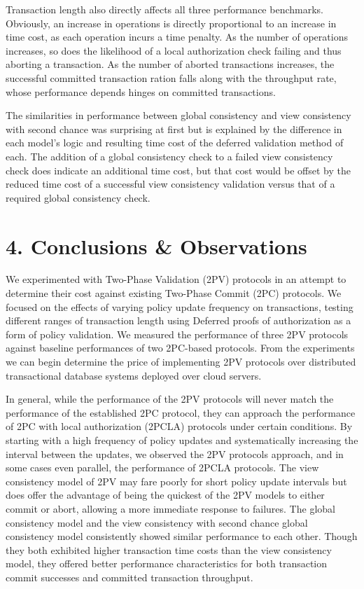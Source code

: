 \documentclass[11pt]{article}
\begin{document}
Transaction length also directly affects all three performance benchmarks. Obviously, an increase in operations is directly proportional to an increase in time cost, as each operation incurs a time penalty. As the number of operations increases, so does the likelihood of a local authorization check failing and thus aborting a transaction. As the number of aborted transactions increases, the successful committed transaction ration falls along with the throughput rate, whose performance depends hinges on committed transactions.

The similarities in performance between global consistency and view consistency with second chance was surprising at first but is explained by the difference in each model's logic and resulting time cost of the deferred validation method of each. The addition of a global consistency check to a failed view consistency check does indicate an additional time cost, but that cost would be offset by the reduced time cost of a successful view consistency validation versus that of a required global consistency check.
\section{4. Conclusions \& Observations}
We experimented with Two-Phase Validation (2PV) protocols in an attempt to determine their cost against existing Two-Phase Commit (2PC) protocols. We focused on the effects of varying policy update frequency on transactions, testing different ranges of transaction length using Deferred proofs of authorization as a form of policy validation. We measured the performance of three 2PV protocols against baseline performances of two 2PC-based protocols. From the experiments we can begin determine the price of implementing 2PV protocols over distributed transactional database systems deployed over cloud servers.

In general, while the performance of the 2PV protocols will never match the performance of the established 2PC protocol, they can approach the performance of 2PC with local authorization (2PCLA) protocols under certain conditions. By starting with a high frequency of policy updates and systematically increasing the interval between the updates, we observed the 2PV protocols approach, and in some cases even parallel, the performance of 2PCLA protocols. The view consistency model of 2PV may fare poorly for short policy update intervals but does offer the advantage of being the quickest of the 2PV models to either commit or abort, allowing a more immediate response to failures. The global consistency model and the view consistency with second chance global consistency model consistently showed similar performance to each other. Though they both exhibited higher transaction time costs than the view consistency model, they offered better performance characteristics for both transaction commit successes and committed transaction throughput.
\end{document}
